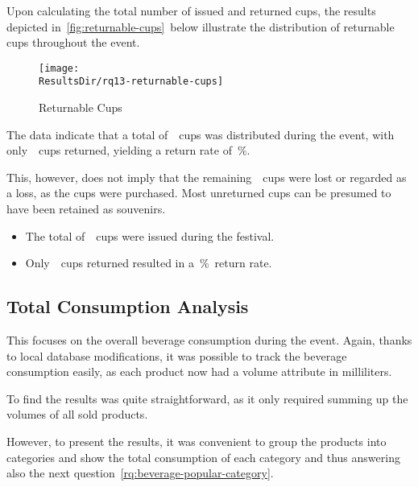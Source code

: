 Upon calculating the total number of issued and returned cups, the results depicted in~\autoref{fig:returnable-cups}~below illustrate the distribution of returnable cups throughout the event.

\begin{figure}[H]
	\centering
	\texttt{[image: \\ResultsDir/rq13-returnable-cups]}
	\caption{Returnable Cups}
	\label{fig:returnable-cups}
	\source
\end{figure}

The data indicate that a total of~~cups was distributed during the event, with only~~cups returned, yielding a return rate of~\%.

This, however, does not imply that the remaining~~cups were lost or regarded as a loss, as the cups were purchased.
Most unreturned cups can be presumed to have been retained as souvenirs.

\begin{keytakeaways}
	\begin{itemize}
		\item The total of~~cups were issued during the festival.
		\item Only~~cups returned resulted in a~\%~return rate.
	\end{itemize}
\end{keytakeaways}


\subsection{Total Consumption Analysis}
\label{subsec:analysis-beverage-total-consumption}

This focuses on the overall beverage consumption during the event.
Again, thanks to local database modifications, it was possible to track the beverage consumption easily, as each product now had a volume attribute in milliliters.

\begin{rqbox}
	\textit{}
\end{rqbox}

To find the results was quite straightforward, as it only required summing up the volumes of all sold products.

However, to present the results, it was convenient to group the products into categories and show the total consumption of each category and thus answering also the next question~\autoref{rq:beverage-popular-category}.

